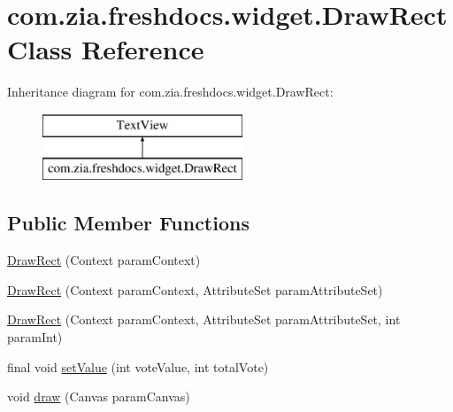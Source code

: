 \hypertarget{classcom_1_1zia_1_1freshdocs_1_1widget_1_1_draw_rect}{\section{com.\-zia.\-freshdocs.\-widget.\-Draw\-Rect Class Reference}
\label{classcom_1_1zia_1_1freshdocs_1_1widget_1_1_draw_rect}
}
Inheritance diagram for com.\-zia.\-freshdocs.\-widget.\-Draw\-Rect\-:\begin{figure}[H]
\begin{center}
\leavevmode
\includegraphics[height=2.000000cm]{classcom_1_1zia_1_1freshdocs_1_1widget_1_1_draw_rect}
\end{center}
\end{figure}
\subsection*{Public Member Functions}
\begin{DoxyCompactItemize}
\item 
\hyperlink{classcom_1_1zia_1_1freshdocs_1_1widget_1_1_draw_rect_afa43c6abcad8e56005eafea4f5fd08fd}{Draw\-Rect} (Context param\-Context)
\item 
\hyperlink{classcom_1_1zia_1_1freshdocs_1_1widget_1_1_draw_rect_a75667e02aaec3c41c004b6638f5a0304}{Draw\-Rect} (Context param\-Context, Attribute\-Set param\-Attribute\-Set)
\item 
\hyperlink{classcom_1_1zia_1_1freshdocs_1_1widget_1_1_draw_rect_ad5a6ad13736b1d1386060d86aa3fa8ab}{Draw\-Rect} (Context param\-Context, Attribute\-Set param\-Attribute\-Set, int param\-Int)
\item 
final void \hyperlink{classcom_1_1zia_1_1freshdocs_1_1widget_1_1_draw_rect_ae0cdac115aa2fb04c33cbeeca4a593b3}{set\-Value} (int vote\-Value, int total\-Vote)
\item 
void \hyperlink{classcom_1_1zia_1_1freshdocs_1_1widget_1_1_draw_rect_a7b0128704b78b4da1cced0ed7bbab24e}{draw} (Canvas param\-Canvas)
\end{DoxyCompactItemize}


